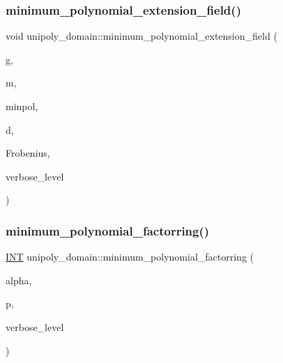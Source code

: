 \mbox{\label{classunipoly__domain_a9dc5c278971918ab49bcf41c43536a74}} 
\subsubsection{\texorpdfstring{minimum\+\_\+polynomial\+\_\+extension\+\_\+field()}{minimum\_polynomial\_extension\_field()}}
{\footnotesize\ttfamily void unipoly\+\_\+domain\+::minimum\+\_\+polynomial\+\_\+extension\+\_\+field (\begin{DoxyParamCaption}\item[{\mbox{\hyperlink{galois_8h_a77ca58de3d2da6172242493dd9c8aaa8}{unipoly\+\_\+object}} \&}]{g,  }\item[{\mbox{\hyperlink{galois_8h_a77ca58de3d2da6172242493dd9c8aaa8}{unipoly\+\_\+object}}}]{m,  }\item[{\mbox{\hyperlink{galois_8h_a77ca58de3d2da6172242493dd9c8aaa8}{unipoly\+\_\+object}} \&}]{minpol,  }\item[{\mbox{\hyperlink{galois_8h_a09fddde158a3a20bd2dcadb609de11dc}{I\+NT}}}]{d,  }\item[{\mbox{\hyperlink{galois_8h_a09fddde158a3a20bd2dcadb609de11dc}{I\+NT}} $\ast$}]{Frobenius,  }\item[{\mbox{\hyperlink{galois_8h_a09fddde158a3a20bd2dcadb609de11dc}{I\+NT}}}]{verbose\+\_\+level }\end{DoxyParamCaption})}

\mbox{\label{classunipoly__domain_a32acf71ba55156289a07290565ccb65c}} 
\subsubsection{\texorpdfstring{minimum\+\_\+polynomial\+\_\+factorring()}{minimum\_polynomial\_factorring()}}
{\footnotesize\ttfamily \mbox{\hyperlink{galois_8h_a09fddde158a3a20bd2dcadb609de11dc}{I\+NT}} unipoly\+\_\+domain\+::minimum\+\_\+polynomial\+\_\+factorring (\begin{DoxyParamCaption}\item[{\mbox{\hyperlink{galois_8h_a09fddde158a3a20bd2dcadb609de11dc}{I\+NT}}}]{alpha,  }\item[{\mbox{\hyperlink{galois_8h_a09fddde158a3a20bd2dcadb609de11dc}{I\+NT}}}]{p,  }\item[{\mbox{\hyperlink{galois_8h_a09fddde158a3a20bd2dcadb609de11dc}{I\+NT}}}]{verbose\+\_\+level }\end{DoxyParamCaption})}

